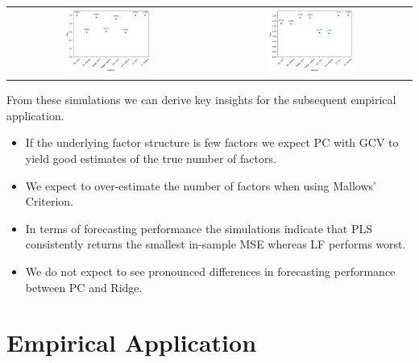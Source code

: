 \begin{table}[h! ]
\begin{tabular}{c c}
        \includegraphics[width=0.45\textwidth]{figures/N200_T500_DGP5_Sims25} &
        \includegraphics[width=0.45\textwidth]{figures/N200_T500_DGP6_Sims25}
    \end{tabular}
\end{table}

From these simulations we can derive key insights for the subsequent empirical application. 
\begin{itemize}
	\item If the underlying factor structure is few factors we expect PC with GCV to yield good estimates of the true number of factors. 
	\item We expect to over-estimate the number of factors when using Mallows' Criterion.
	\item In terms of forecasting performance the simulations indicate that PLS consistently returns the smallest in-sample MSE whereas LF performs worst.
	\item We do not expect to see pronounced differences in forecasting performance between PC and Ridge. 
\end{itemize}

\clearpage

\section{Empirical Application}
